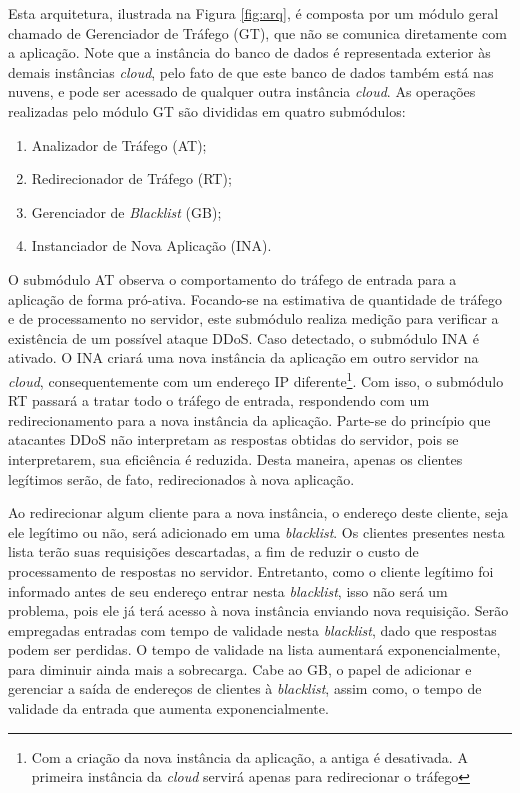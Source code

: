 Esta arquitetura, ilustrada na Figura \ref{fig:arq}, é composta por um módulo geral chamado de Gerenciador de Tráfego (GT), que não se comunica diretamente com a aplicação. Note que a instância do banco de dados é representada exterior às demais instâncias \emph{cloud}, pelo fato de que este banco de dados também está nas nuvens, e pode ser acessado de qualquer outra instância \emph{cloud}. As operações realizadas pelo módulo GT são divididas em quatro submódulos:


\begin{enumerate}[i]
  \item Analizador de Tráfego (AT);
  \item Redirecionador de Tráfego (RT);
  \item Gerenciador de \emph{Blacklist} (GB);
  \item Instanciador de Nova Aplicação (INA).
\end{enumerate}


O submódulo AT observa o comportamento do tráfego de entrada para a aplicação de forma pró-ativa. Focando-se na estimativa de quantidade de tráfego e de processamento no servidor, este submódulo realiza medição para verificar a existência de um possível ataque DDoS. Caso detectado, o submódulo INA é ativado. O INA criará uma nova instância da aplicação em outro servidor na \emph{cloud}, consequentemente com um endereço IP diferente\footnote{Com a criação da nova instância da aplicação, a antiga é desativada. A primeira instância da \emph{cloud} servirá apenas para redirecionar o tráfego}. Com isso, o submódulo RT passará a tratar todo o tráfego de entrada, respondendo com um redirecionamento para a nova instância da aplicação. Parte-se do princípio que atacantes DDoS não interpretam as respostas obtidas do servidor, pois se interpretarem, sua eficiência é reduzida. Desta maneira, apenas os clientes legítimos serão, de fato, redirecionados à nova aplicação.

Ao redirecionar algum cliente para a nova instância, o endereço deste cliente, seja ele legítimo ou não, será adicionado em uma \emph{blacklist}. Os clientes presentes nesta lista terão suas requisições descartadas, a fim de reduzir o custo de processamento de respostas no servidor. Entretanto, como o cliente legítimo foi informado antes de seu endereço entrar nesta \emph{blacklist}, isso não será um problema, pois ele já terá acesso à nova instância enviando nova requisição. Serão empregadas entradas com tempo de validade nesta \emph{blacklist}, dado que respostas podem ser perdidas. O tempo de validade na lista aumentará exponencialmente, para diminuir ainda mais a sobrecarga. Cabe ao GB, o papel de adicionar e gerenciar a saída de endereços de clientes à \emph{blacklist}, assim como, o tempo de validade da entrada que aumenta exponencialmente.

